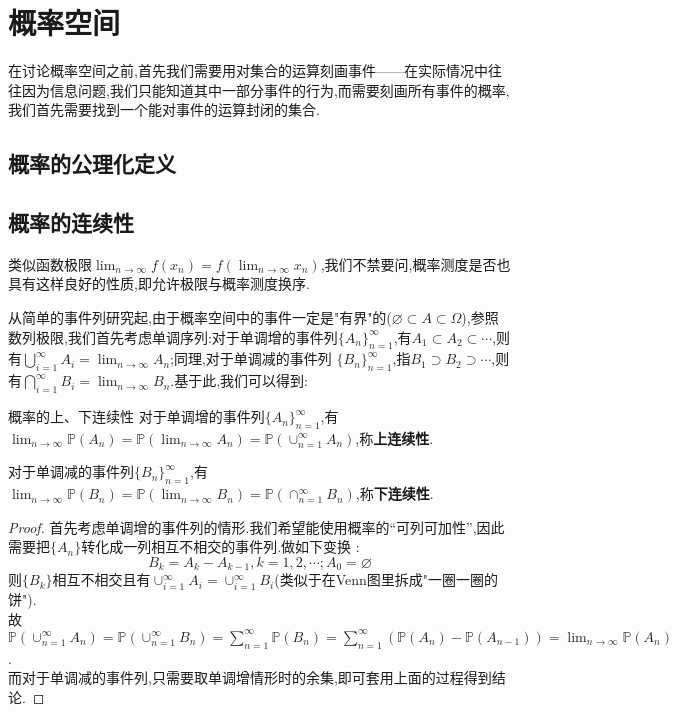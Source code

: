 \chapter{概率空间}
在讨论概率空间之前,首先我们需要用对集合的运算刻画事件——在实际情况中往往因为信息问题,我们只能知道其中一部分事件的行为,而需要刻画所有事件的概率,我们首先需要找到一个能对事件的运算封闭的集合.
\section{概率的公理化定义}
\section{概率的连续性}
类似函数极限$\lim_{n\to\infty}f(x_n)=f(\lim_{n\to\infty}x_n)$,我们不禁要问,概率测度是否也具有这样良好的性质,即允许极限与概率测度换序.

从简单的事件列研究起,由于概率空间中的事件一定是"有界"的($\varnothing \subset A\subset \Omega$),参照数列极限,我们首先考虑单调序列:对于单调增的事件列$\{A_n\}_{n=1}^{\infty}$,有$A_1\subset A_2\subset \cdots$,则有$\bigcup_{i=1}^{\infty}A_i=\lim_{n\to\infty}A_n$;同理,对于单调减的事件列
$\{B_n\}_{n=1}^{\infty}$,指$B_1\supset B_2\supset \cdots$,则有$\bigcap_{i=1}^{\infty}B_i=\lim_{n\to\infty}B_n$.基于此,我们可以得到:
\begin{theorem}{概率的上、下连续性}{}
    对于单调增的事件列$\{A_n\}_{n=1}^{\infty}$,有$\lim_{n\to\infty}\mathbb{P}(A_n)=\mathbb{P}(\lim_{n\to\infty}A_n)=\mathbb{P}(\cup_{n=1}^{\infty}A_n)$,称\textbf{上连续性}.

    对于单调减的事件列$\{B_n\}_{n=1}^{\infty}$,有$\lim_{n\to\infty}\mathbb{P}(B_n)=\mathbb{P}(\lim_{n\to\infty}B_n)=\mathbb{P}(\cap_{n=1}^{\infty}B_n)$,称\textbf{下连续性}.
\end{theorem}
\begin{proof}
    首先考虑单调增的事件列的情形.我们希望能使用概率的“可列可加性”,因此需要把$\{A_n\}$转化成一列相互不相交的事件列.做如下变换 :
    $$B_k=A_k-A_{k-1},k=1,2,\cdots;A_0=\varnothing$$
    则$\{B_k\}$相互不相交且有$\cup_{i=1}^{\infty}{A_i}=\cup_{i=1}^{\infty}B_i$(类似于在Venn图里拆成"一圈一圈的饼").\\
    故$\mathbb{P}(\cup_{n=1}^{\infty}A_n)=\mathbb{P}(\cup_{n=1}^{\infty}B_n)=\sum_{n=1}^{\infty}\mathbb{P}(B_n)=\sum_{n=1}^{\infty}(\mathbb{P}(A_{n})-\mathbb{P}(A_{n-1}))=\lim_{n\to\infty}\mathbb{P}(A_n)$.\\
    而对于单调减的事件列,只需要取单调增情形时的余集,即可套用上面的过程得到结论.
\end{proof}


